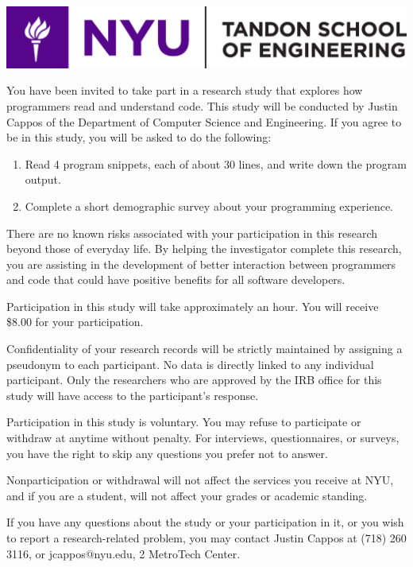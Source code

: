 \documentclass[12pt, a4paper, oneside]{article}
\begin{document}
\thispagestyle{empty}

\includegraphics[width=0.5\paperwidth]{images/tandon_long_color.png}

\vspace{20pt}

You have been invited to take part in a research study that explores
how programmers read and understand code. This study will be conducted
by Justin Cappos of the Department of Computer Science and Engineering.
If you agree to be in this study, you will be asked to do the
following:

\begin{enumerate}
\item
  {Read 4 program snippets, each of about 30 lines, and write down the
  program output.}
\item
  {Complete a short demographic survey about your programming
  experience.}
\end{enumerate}

There are no known risks associated with your participation in this
research beyond those of everyday life. By helping the investigator
complete this research, you are assisting in the development of better
interaction between programmers and code that could have positive
benefits for all software developers.

Participation in this study will take approximately an hour. You
will receive \$8.00 for your participation.

Confidentiality of your research records will be strictly maintained by
assigning a pseudonym to each participant. No data is directly linked to
any individual participant. Only the researchers who are approved by the
IRB office for this study will have access to the participant's
response.

Participation in this study is voluntary. You may refuse to participate
or withdraw at anytime without penalty. For interviews, questionnaires,
or surveys, you have the right to skip any questions you prefer not to
answer.

Nonparticipation or withdrawal will not affect the services you receive
at NYU, and if you are a student, will not affect your grades or
academic standing.

If you have any questions about the study or your participation in it,
or you wish to report a research-related problem, you may contact Justin
Cappos at (718) 260 3116, or jcappos@nyu.edu, 2 MetroTech Center.
\end{document}

